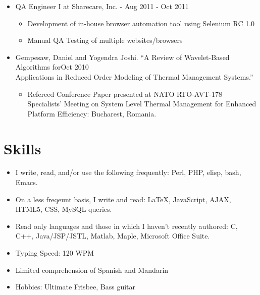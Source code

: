 \documentclass[10pt]{article}
\newenvironment{myitem}{
\begin{itemize}
  \setlength{\itemsep}{1pt}
  \setlength{\parskip}{0pt}
  \setlength{\parsep}{0pt}
}{\end{itemize}}
\begin{document}
\begin{myitem}
\begin{myitem}
  \item QA Engineer I at Sharecare, Inc. - \hfill Aug 2011 - Oct 2011
  \begin{myitem}
    \item Development of in-house browser automation tool using Selenium RC 1.0
    \item Manual QA Testing of multiple websites/browsers
  \end{myitem}

  \item Gempesaw, Daniel and Yogendra Joshi. ``A Review of Wavelet-Based Algorithms for\hfill Oct 2010\\ 
Applications in Reduced Order Modeling of Thermal Management Systems.''
  \begin{myitem}
    \item Refereed Conference Paper presented at NATO RTO-AVT-178 Specialists' Meeting on System Level Thermal Management for Enhanced Platform Efficiency: Bucharest, Romania. 
  \end{myitem}
\end{myitem}

\vspace{-.55cm}
\section{Skills}
\vspace{-0.25cm}
\begin{myitem}
\item I write, read, and/or use the following frequently: Perl, PHP, elisp, bash, Emacs.
\item On a less freqeunt basis, I write and read: \LaTeX, JavaScript, AJAX, HTML5, CSS, MySQL queries.
\item Read only languages and those in which I haven't recently authored: C, C++, Java/JSP/JSTL, Matlab, Maple, Microsoft Office Suite.
\item Typing Speed: 120 WPM
\item Limited comprehension of Spanish and Mandarin
\item Hobbies: Ultimate Frisbee, Bass guitar
\end{myitem}


\end{myitem}
\end{document}
